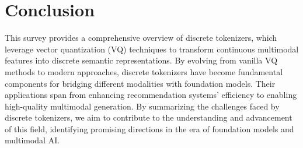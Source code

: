 \section{Conclusion} \label{sec:conclusion}

This survey provides a comprehensive overview of discrete tokenizers, which leverage vector quantization (VQ) techniques to transform continuous multimodal features into discrete semantic representations. 
By evolving from vanilla VQ methods to modern approaches, discrete tokenizers have become fundamental components for bridging different modalities with foundation models. 
Their applications span from enhancing recommendation systems' efficiency to enabling high-quality multimodal generation.
By summarizing the challenges faced by discrete tokenizers, we aim to contribute to the understanding and advancement of this field, 
identifying promising directions in the era of foundation models and multimodal AI.
